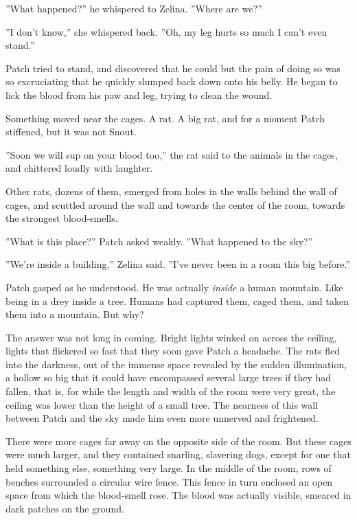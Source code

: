 \documentclass[12pt]{book}
\begin{document}
''What happened?'' he whispered to Zelina. ''Where are we?''

''I don't know,'' she whispered back. ''Oh, my leg hurts so much I can't even stand.''

Patch tried to stand, and discovered that he could %
but the pain of doing so was so excruciating that he quickly slumped back down onto his belly. He began to lick the blood from his paw and leg, trying to clean the wound.

Something moved near the cages. A rat. A big rat, and for a moment Patch stiffened, but it was not Snout.

''Soon we will sup on your blood too,'' the rat said to the animals in the cages, and chittered loudly with laughter.

Other rats, dozens of them, emerged from holes in the walls behind the wall of cages, and scuttled around the wall and towards the center of the room, towards the strongest blood-smells.

''What is this place?'' Patch asked weakly. ''What happened to the sky?''

''We're inside a building,'' Zelina said. ''I've never been in a room this big before.''

Patch gasped as he understood. He was actually {\it inside} a human mountain. Like being in a drey inside a tree. Humans had captured them, caged them, and taken them into a mountain. But why?

The answer was not long in coming. Bright lights winked on across the ceiling, lights that flickered so fast that they soon gave Patch a headache. The rats fled into the darkness, out of the immense space revealed by the sudden illumination, a hollow so big that it could have encompassed several large trees %
if they had fallen, that is, for while the length and width of the room were very great, the ceiling was lower than the height of a small tree. The nearness of this wall between Patch and the sky made him even more unnerved and frightened.

There were more cages far away on the opposite side of the room. But these cages were much larger, and they contained snarling, slavering dogs, except for one that held %
something else, something very large. In the middle of the room, rows of benches surrounded a circular wire fence. This fence in turn enclosed an open space from which the blood-smell rose. The blood was actually visible, smeared in dark patches on the ground.
\end{document}
